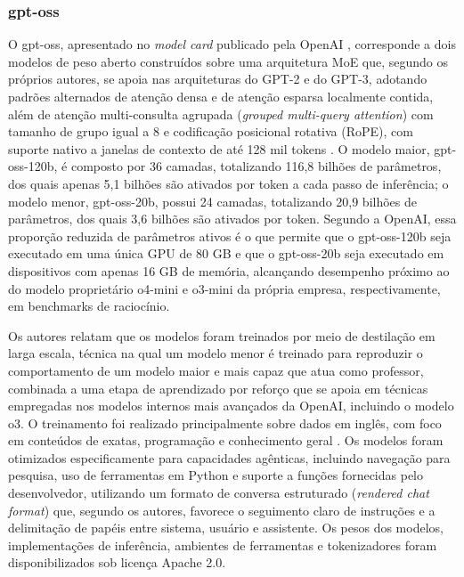\subsubsection{gpt-oss}

O gpt-oss, apresentado no \textit{model card} publicado pela OpenAI \citep{gptossmodelcard2025}, corresponde a dois modelos de peso aberto construídos sobre uma arquitetura MoE que, segundo os próprios autores, se apoia nas arquiteturas do GPT-2 e do GPT-3, adotando padrões alternados de atenção densa e de atenção esparsa localmente contida, além de atenção multi-consulta agrupada (\textit{grouped multi-query attention}) com tamanho de grupo igual a 8 e codificação posicional rotativa (RoPE), com suporte nativo a janelas de contexto de até 128 mil tokens \citep{openai2025gptossblog}. O modelo maior, gpt-oss-120b, é composto por 36 camadas, totalizando 116,8 bilhões de parâmetros, dos quais apenas 5,1 bilhões são ativados por token a cada passo de inferência; o modelo menor, gpt-oss-20b, possui 24 camadas, totalizando 20,9 bilhões de parâmetros, dos quais 3,6 bilhões são ativados por token. Segundo a OpenAI, essa proporção reduzida de parâmetros ativos é o que permite que o gpt-oss-120b seja executado em uma única GPU de 80 GB e que o gpt-oss-20b seja executado em dispositivos com apenas 16 GB de memória, alcançando desempenho próximo ao do modelo proprietário o4-mini e o3-mini da própria empresa, respectivamente, em benchmarks de raciocínio.

Os autores relatam que os modelos foram treinados por meio de destilação em larga escala, técnica na qual um modelo menor é treinado para reproduzir o comportamento de um modelo maior e mais capaz que atua como professor, combinada a uma etapa de aprendizado por reforço que se apoia em técnicas empregadas nos modelos internos mais avançados da OpenAI, incluindo o modelo o3. O treinamento foi realizado principalmente sobre dados em inglês, com foco em conteúdos de exatas, programação e conhecimento geral \citep{openai2025gptossblog}. Os modelos foram otimizados especificamente para capacidades agênticas, incluindo navegação para pesquisa, uso de ferramentas em Python e suporte a funções fornecidas pelo desenvolvedor, utilizando um formato de conversa estruturado (\textit{rendered chat format}) que, segundo os autores, favorece o seguimento claro de instruções e a delimitação de papéis entre sistema, usuário e assistente. Os pesos dos modelos, implementações de inferência, ambientes de ferramentas e tokenizadores foram disponibilizados sob licença Apache 2.0.

